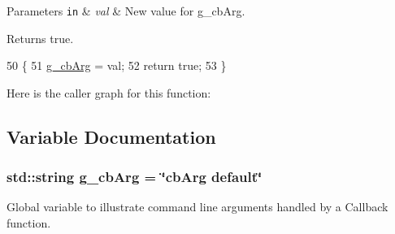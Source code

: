 \begin{DoxyParams}[1]{Parameters}
\mbox{\tt in}  & {\em val} & New value for {\ttfamily g\+\_\+cb\+Arg}. \\
\hline
\end{DoxyParams}
\begin{DoxyReturn}{Returns}
{\ttfamily true}. 
\end{DoxyReturn}

\begin{DoxyCode}
50 \{
51   \hyperlink{command-line-example_8cc_a99e375de1019bb4a4246819f47a4cbdc}{g\_cbArg} = val;
52   \textcolor{keywordflow}{return} \textcolor{keyword}{true};
53 \}
\end{DoxyCode}


Here is the caller graph for this function\+:




\subsection{Variable Documentation}
\subsubsection[{\texorpdfstring{g\+\_\+cb\+Arg}{g_cbArg}}]{\setlength{\rightskip}{0pt plus 5cm}std\+::string g\+\_\+cb\+Arg = \char`\"{}cb\+Arg default\char`\"{}}\hypertarget{command-line-example_8cc_a99e375de1019bb4a4246819f47a4cbdc}{}\label{command-line-example_8cc_a99e375de1019bb4a4246819f47a4cbdc}
Global variable to illustrate command line arguments handled by a Callback function. 